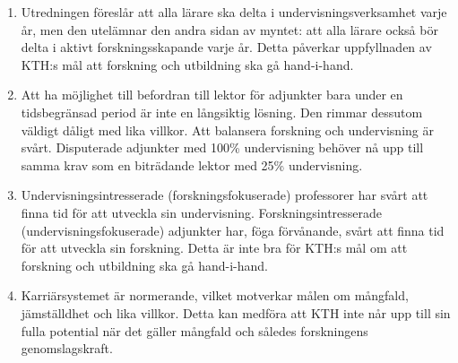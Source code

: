 \begin{enumerate}
  \item Utredningen föreslår att alla lärare ska delta i 
    undervisningsverksamhet varje år,
    men den utelämnar den andra sidan av myntet: att alla lärare också bör 
    delta i aktivt forskningsskapande varje år.
    Detta påverkar uppfyllnaden av KTH:s mål att forskning och utbildning ska 
    gå hand-i-hand.
  \item Att ha möjlighet till befordran till lektor för adjunkter bara under en 
    tidsbegränsad period är inte en långsiktig lösning.
    Den rimmar dessutom väldigt dåligt med lika villkor.
    Att balansera forskning och undervisning är svårt.
    Disputerade adjunkter med 100\% undervisning behöver nå upp till samma krav 
    som en biträdande lektor med 25\% undervisning.
  \item Undervisningsintresserade (forskningsfokuserade) professorer har svårt 
    att finna tid för att utveckla sin undervisning.
    Forskningsintresserade (undervisningsfokuserade) adjunkter har, föga 
    förvånande, svårt att finna tid för att utveckla sin forskning.
    Detta är inte bra för KTH:s mål om att forskning och utbildning ska gå 
    hand-i-hand.
  \item Karriärsystemet är normerande, vilket motverkar målen om mångfald, 
    jämställdhet och lika villkor.
    Detta kan medföra att KTH inte når upp till sin fulla potential när det 
    gäller mångfald och således forskningens genomslagskraft.
\end{enumerate}
